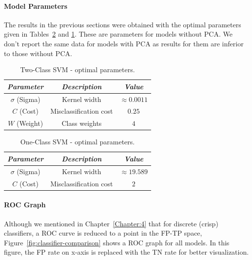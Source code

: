 \paragraph*{Model Parameters} \hfill \break
The results in the previous sections were obtained with the optimal parameters given in Tables~\ref{tab:params-oc} and \ref{tab:params-twoc}. These are parameters for models without PCA. We don't report the same data for models with PCA as results for them are inferior to those without PCA.

\begin{table}[ht!]
  \begin{center}
    \caption{Two-Class SVM - optimal parameters.}
    \label{tab:params-twoc}
    \begin{tabular}{|c|c|c|}\hline
    \textit{Parameter} & \textit{Description} & \textit{Value} \\
      \hline
    \(\sigma\) (Sigma) & Kernel width & \(\approx 0.0011\) \\ 
     \hline
     \(C\) (Cost) & Misclassification cost &  \(0.25\) \\
     \hline
     \(W\) (Weight) & Class weights & \(4\) \\
     \hline
    \end{tabular}
  \end{center}
\end{table}

\begin{table}[h!]
  \begin{center}
    \caption{One-Class SVM - optimal parameters.}
    \label{tab:params-oc}
    \begin{tabular}{|c|c|c|}\hline
    \textit{Parameter} & \textit{Description} & \textit{Value} \\
      \hline
    \(\sigma\) (Sigma) & Kernel width & \(\approx19.589\) \\ 
     \hline
     \(C\) (Cost) & Misclassification cost &  \(2\) \\
     \hline
    \end{tabular}
  \end{center}
\end{table}


\paragraph*{ROC Graph} \hfill \break
Although we mentioned in Chapter~\ref{Chapter:4} that for discrete (crisp) classifiers, a ROC curve is reduced to a point in the FP-TP space, Figure~\ref{fig:classifier-comparison} shows a ROC graph for all models. In this figure, the FP rate on x-axis is replaced with the TN rate for better visualization.

